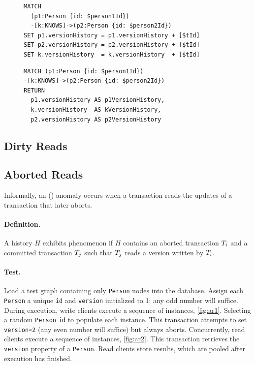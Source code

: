 \begin{figure}[htb]
  \centering
  \begin{minipage}{0.53\linewidth}
\begin{lstlisting}[language=cypher,label=fig:dw1,caption=\tx{Dirty Write (G0) $T_\mathrm{W}$}.]
MATCH
  (p1:Person {id: $person1Id})
  -[k:KNOWS]->(p2:Person {id: $person2Id})
SET p1.versionHistory = p1.versionHistory + [$tId]
SET p2.versionHistory = p2.versionHistory + [$tId]
SET k.versionHistory  = k.versionHistory  + [$tId]
\end{lstlisting}
\end{minipage}
\quad
\begin{minipage}{0.431\linewidth}
\begin{lstlisting}[language=cypher,label=fig:dw2,caption=\tx{Dirty Write (G0) $T_\mathrm{R}$}.]
MATCH (p1:Person {id: $person1Id})
-[k:KNOWS]->(p2:Person {id: $person2Id})
RETURN
  p1.versionHistory AS p1VersionHistory,
  k.versionHistory  AS kVersionHistory,
  p2.versionHistory AS p2VersionHistory
\end{lstlisting}
\end{minipage}
\end{figure}

\subsection{Dirty Reads}
\label{sec:dirty-reads-1}

\subsection*{Aborted Reads}

Informally, an  () anomaly occurs when a transaction reads the updates of a transaction that later aborts.

\paragraph{Definition.}
A history $H$ exhibits phenomenon  if $H$ contains an aborted transaction $T_i$ and a committed transaction $T_j$ such that $T_j$ reads a version written by $T_i$.

\paragraph{Test.}
Load a test graph containing only \texttt{Person} nodes into the database.
Assign each \texttt{Person} a unique \texttt{id} and \texttt{version} initialized to 1; any odd number will suffice.
During execution, write clients execute a sequence of  instances, \autoref{fig:ar1}.
Selecting a random \texttt{Person} \texttt{id} to populate each instance.
This transaction attempts to set \texttt{version=2} (any even number will suffice) but always aborts.
Concurrently, read clients execute a sequence of  instances, \autoref{fig:ar2}.
This transaction retrieves the \texttt{version} property of a \texttt{Person}.
Read clients store results, which are pooled after execution has finished.

